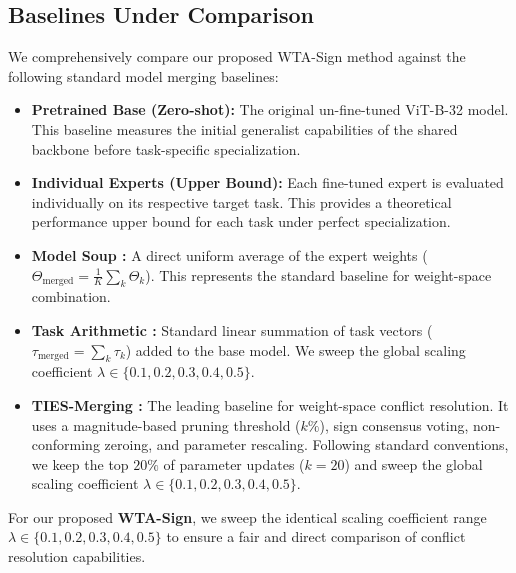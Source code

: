 \subsection{Baselines Under Comparison}

We comprehensively compare our proposed WTA-Sign method against the following standard model merging baselines:
\begin{itemize}
    \item \textbf{Pretrained Base (Zero-shot):} The original un-fine-tuned ViT-B-32 model. This baseline measures the initial generalist capabilities of the shared backbone before task-specific specialization.
    \item \textbf{Individual Experts (Upper Bound):} Each fine-tuned expert is evaluated individually on its respective target task. This provides a theoretical performance upper bound for each task under perfect specialization.
    \item \textbf{Model Soup \cite{wortsman2022robust}:} A direct uniform average of the expert weights ($\Theta_{\text{merged}} = \frac{1}{K}\sum_k \Theta_k$). This represents the standard baseline for weight-space combination.
    \item \textbf{Task Arithmetic \cite{ilharco2022editing}:} Standard linear summation of task vectors ($\tau_{\text{merged}} = \sum_k \tau_k$) added to the base model. We sweep the global scaling coefficient $\lambda \in \{0.1, 0.2, 0.3, 0.4, 0.5\}$.
    \item \textbf{TIES-Merging \cite{yadav2023ties}:} The leading baseline for weight-space conflict resolution. It uses a magnitude-based pruning threshold ($k\%$), sign consensus voting, non-conforming zeroing, and parameter rescaling. Following standard conventions, we keep the top $20\%$ of parameter updates ($k=20$) and sweep the global scaling coefficient $\lambda \in \{0.1, 0.2, 0.3, 0.4, 0.5\}$.
\end{itemize}

For our proposed \textbf{WTA-Sign}, we sweep the identical scaling coefficient range $\lambda \in \{0.1, 0.2, 0.3, 0.4, 0.5\}$ to ensure a fair and direct comparison of conflict resolution capabilities.

